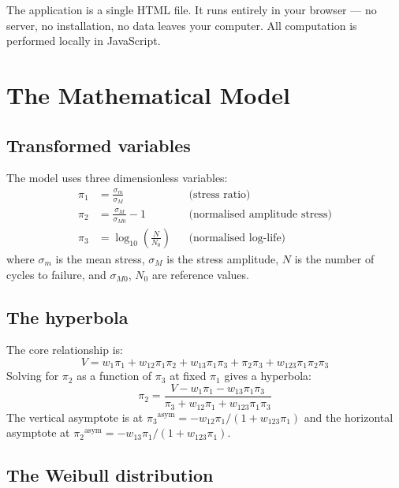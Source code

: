 \documentclass[11pt,a4paper]{article}
\newcommand{\piz}{\ensuremath{\pi_3}}
\newcommand{\pit}{\ensuremath{\pi_2}}
\newcommand{\pio}{\ensuremath{\pi_1}}
\newcommand{\sm}{\ensuremath{\sigma_m}}
\newcommand{\sM}{\ensuremath{\sigma_M}}
\newcommand{\sMzero}{\ensuremath{\sigma_{M0}}}
\newcommand{\Nzero}{\ensuremath{N_0}}
\begin{document}
\begin{notebox}
The application is a single HTML file. It runs entirely in your browser --- no server, no installation, no data leaves your computer. All computation is performed locally in JavaScript.
\end{notebox}

\section{The Mathematical Model}

\subsection{Transformed variables}

The model uses three dimensionless variables:
\begin{align}
  \pio &= \frac{\sm}{\sM} && \text{(stress ratio)} \\[2pt]
  \pit &= \frac{\sM}{\sMzero} - 1 && \text{(normalised amplitude stress)} \\[2pt]
  \piz &= \log_{10}\!\left(\frac{N}{\Nzero}\right) && \text{(normalised log-life)}
\end{align}
where $\sm$ is the mean stress, $\sM$ is the stress amplitude, $N$ is the number of cycles to failure, and $\sMzero$, $\Nzero$ are reference values.

\subsection{The hyperbola}

The core relationship is:
\begin{equation}
  V = w_1\pio + w_{12}\pio\pit + w_{13}\pio\piz + \pit\piz + w_{123}\pio\pit\piz
  \label{eq:V}
\end{equation}
Solving for $\pit$ as a function of $\piz$ at fixed $\pio$ gives a hyperbola:
\begin{equation}
  \pit = \frac{V - w_1\pio - w_{13}\pio\piz}{\piz + w_{12}\pio + w_{123}\pio\piz}
\end{equation}
The vertical asymptote is at $\piz^{\text{asym}} = -w_{12}\pio/(1+w_{123}\pio)$ and the horizontal asymptote at $\pit^{\text{asym}} = -w_{13}\pio/(1+w_{123}\pio)$.

\subsection{The Weibull distribution}
\end{document}
